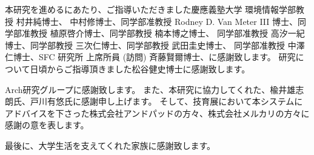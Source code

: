 \begin{acknowledgment}

本研究を進めるにあたり、ご指導いただきました慶應義塾大学 環境情報学部教授 村井純博士、
中村修博士、同学部准教授 Rodney D. Van Meter III 博士、同学部准教授 植原啓介博士、同学部教授 楠本博之博士、
同学部准教授 高汐一紀博士、同学部教授 三次仁博士、同学部教授 武田圭史博士、
同学部准教授 中澤仁博士、SFC 研究所 上席所員 (訪問) 斉藤賢爾博士、に感謝致します。
研究について日頃からご指導頂きました松谷健史博士に感謝致します。

Arch研究グループに感謝致します。
また、本研究に協力してくれた、楡井雄志朗氏、戸川有悠氏に感謝申し上げます。
そして、技育展において本システムにアドバイスを下さった株式会社アンドパッドの方々、株式会社メルカリの方々に感謝の意を表します。

最後に、大学生活を支えてくれた家族に感謝致します。

\end{acknowledgment}
